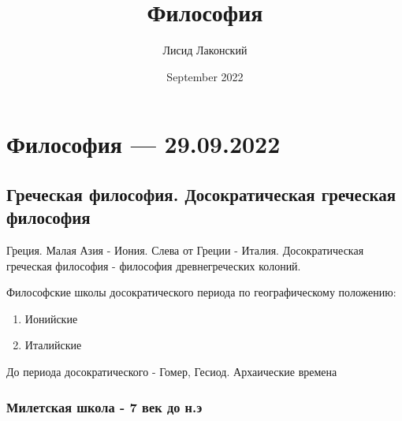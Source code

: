 \documentclass{article}
\title{Философия}
\author{Лисид Лаконский}
\date{September 2022}
\begin{document}
\maketitle
\tableofcontents
\pagebreak

\section{Философия — 29.09.2022}

\subsection{Греческая философия. Досократическая греческая философия}

\begin{flushleft}
Греция. Малая Азия - Иония. Слева от Греции - Италия. Досократическая греческая философия - философия древнегреческих колоний.

Философские школы досократического периода по географическому положению:

\begin{enumerate}
    \item Ионийские
    \item Италийские
\end{enumerate}

До периода досократического - Гомер, Гесиод. Архаические времена

\end{flushleft}

\subsubsection{Милетская школа - 7 век до н.э}
\end{document}
